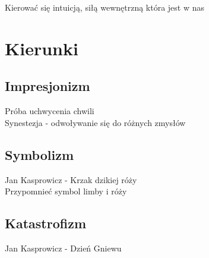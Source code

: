 \documentclass{article}
\begin{document}
Kierować się intuicją, siłą wewnętrzną która jest w nas
\section{Kierunki}
\subsection{Impresjonizm}
Próba uchwycenia chwili \\
Synestezja - odwoływanie się do różnych zmysłów
\subsection{Symbolizm}
Jan Kasprowicz - Krzak dzikiej róży \\
Przypomnieć symbol limby i róży
\subsection{Katastrofizm}
Jan Kasprowicz - Dzień Gniewu
\end{document}
